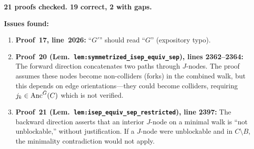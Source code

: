 \documentclass{article}
\begin{document}
\textbf{21 proofs checked.  19 correct, 2 with gaps.}

\bigskip\noindent
\textbf{Issues found:}
\begin{enumerate}
  \item \textbf{Proof~17, line~2026:} ``$G'$'' should read ``$G$'' (expository typo).
  \item \textbf{Proof~20 (Lem.\ \texttt{lem:symmetrized\_isep\_equiv\_sep}),
    lines 2362--2364:} The forward direction concatenates two paths through
    $J$-nodes.  The proof assumes these nodes become non-colliders (forks) in the
    combined walk, but this depends on edge orientations---they could become
    colliders, requiring $j_k\in\mathrm{Anc}^{\bar G}(C)$ which is not verified.
  \item \textbf{Proof~21 (Lem.\ \texttt{lem:isep\_equiv\_sep\_restricted}),
    line 2397:} The backward direction asserts that an interior $J$-node on
    a minimal walk is ``not unblockable,'' without justification.  If a $J$-node
    were unblockable and in $C\setminus B$, the minimality contradiction would
    not apply.
\end{enumerate}
\end{document}
